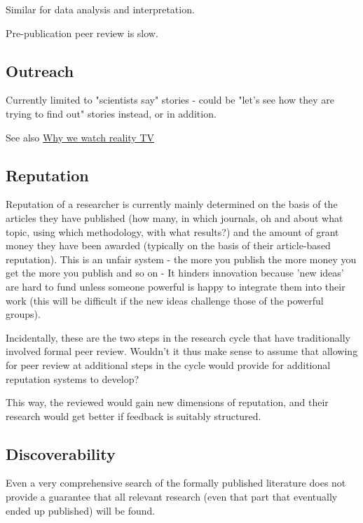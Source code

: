\documentclass[final,authoryear,3p]{elsarticle-open-drafting}
\begin{document}
Similar for data analysis and interpretation.

Pre-publication peer review is slow.

\subsection{Outreach}
Currently limited to "scientists say" stories - could be "let's see how they are trying to find out" stories instead, or in addition.

See also \href{http://psych-your-mind.blogspot.com/2011/06/why-we-watch-reality-tv.html}{Why we watch reality TV}

\subsection{Reputation}
Reputation of a researcher is currently mainly determined on the basis of the articles they have published (how many, in which 
journals, oh and about what topic, using which methodology, with what results?) and the amount of grant money they have been
awarded (typically on the basis of their article-based reputation). This is an unfair system - the more you publish the more money you get the more you publish and so on - It hinders innovation because 'new ideas' are hard to fund unless someone powerful is happy to integrate them into their work (this will be difficult if the new ideas challenge those of the powerful groups). 

Incidentally, these are the two steps in the research cycle that have traditionally involved formal peer review. Wouldn't it thus make sense to assume that allowing for peer review at additional steps in the cycle would provide for additional reputation systems to develop?

This way, the reviewed would gain new dimensions of reputation, and their research would get better if feedback is suitably structured.

\subsection{Discoverability}
Even a very comprehensive search of the formally published literature does not provide a guarantee that all relevant research (even that part that eventually ended up published) will be found. 
\end{document}
